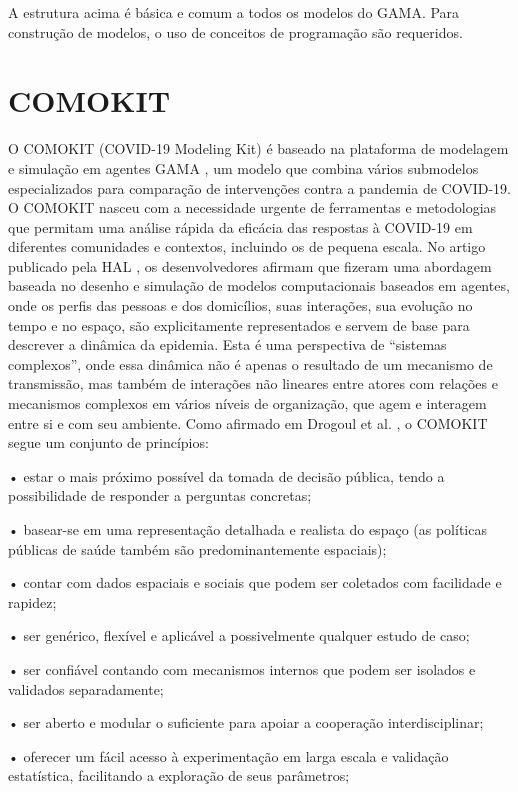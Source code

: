 A estrutura acima é básica e comum a todos os modelos do GAMA. Para construção de modelos, o uso de conceitos de programação são requeridos.

\section{COMOKIT}

O COMOKIT (COVID-19 Modeling Kit) é baseado na plataforma de modelagem e simulação em agentes GAMA \cite{ParametrosCOMOKIT:online}, um modelo que combina vários submodelos especializados para comparação de intervenções contra a pandemia de COVID-19. O COMOKIT nasceu com a necessidade urgente de ferramentas e metodologias que permitam uma análise rápida da eficácia das respostas à COVID-19 em diferentes comunidades e contextos, incluindo os de pequena escala. No artigo publicado pela HAL \cite{banks1996ii}, os desenvolvedores afirmam que fizeram uma abordagem baseada no desenho e simulação de modelos computacionais baseados em agentes, onde os perfis das pessoas e dos domicílios, suas interações, sua evolução no tempo e no espaço, são explicitamente representados e servem de base para descrever a dinâmica da epidemia. Esta é uma perspectiva de “sistemas complexos”, onde essa dinâmica não é apenas o resultado de um mecanismo de transmissão, mas também de interações não lineares entre atores com relações e mecanismos complexos em vários níveis de organização, que agem e interagem entre si e com seu ambiente.
Como afirmado em Drogoul et al. \cite{ParametrosCOMOKIT:online}, o COMOKIT segue um conjunto de princípios:

• estar o mais próximo possível da tomada de decisão pública, tendo a possibilidade de responder a perguntas concretas;

• basear-se em uma representação detalhada e realista do espaço (as políticas públicas de saúde também são predominantemente espaciais);

• contar com dados espaciais e sociais que podem ser coletados com facilidade e rapidez;

• ser genérico, flexível e aplicável a possivelmente qualquer estudo de caso;

• ser confiável contando com mecanismos internos que podem ser isolados e validados separadamente;

• ser aberto e modular o suficiente para apoiar a cooperação interdisciplinar;

• oferecer um fácil acesso à experimentação em larga escala e validação estatística, facilitando a exploração de seus parâmetros;

